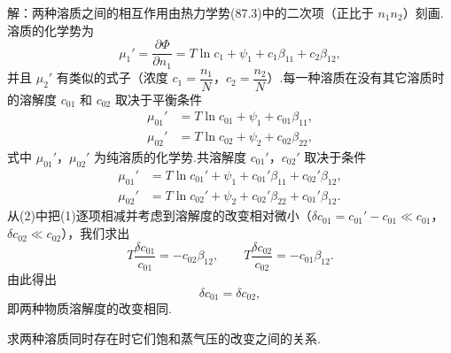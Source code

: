 \begin{xiti}
解：两种溶质之间的相互作用由热力学势(87.3)中的二次项（正比于 $n_1n_2$）刻画.溶质的化学势为
\begin{equation*}
  \mu_1'=\frac{\partial\varPhi}{\partial n_1}
  =T\ln c_1+\psi_1+c_1\beta_{11}+c_2\beta_{12},
\end{equation*}
并且 $\mu_2'$ 有类似的式子（浓度 $c_1=\dfrac{n_1}{N}$，$c_2=\dfrac{n_2}{N}$）.每一种溶质在没有其它溶质时的溶解度 $c_{01}$ 和 $c_{02}$ 取决于平衡条件
\begin{equation*}
\begin{aligned}
  \mu_{01}'&=T\ln c_{01}+\psi_1+c_{01}\beta_{11},\\
  \mu_{02}'&=T\ln c_{02}+\psi_2+c_{02}\beta_{22},
\end{aligned}
\end{equation*}
式中 $\mu_{01}'$，$\mu_{02}'$ 为纯溶质的化学势.共溶解度 $c_{01}'$，$c_{02}'$ 取决于条件
\begin{equation*}
\begin{aligned}
  \mu_{01}'&=T\ln c_{01}'+\psi_1+c_{01}'\beta_{11}+c_{02}'\beta_{12},\\
  \mu_{02}'&=T\ln c_{02}'+\psi_2+c_{02}'\beta_{22}+c_{01}'\beta_{12}.
\end{aligned}
\end{equation*}
从(2)中把(1)逐项相减并考虑到溶解度的改变相对微小（$\delta c_{01}=c_{01}'-c_{01}\ll c_{01}$，$\delta c_{02}\ll c_{02}$），我们求出
\begin{equation*}
  T\frac{\delta c_{01}}{c_{01}}=-c_{02}\beta_{12},\qquad
  T\frac{\delta c_{02}}{c_{02}}=-c_{01}\beta_{12}.
\end{equation*}
由此得出
\begin{equation*}
  \delta c_{01}=\delta c_{02},
\end{equation*}
即两种物质溶解度的改变相同.

\quad 求两种溶质同时存在时它们饱和蒸气压的改变之间的关系.


\end{xiti}
